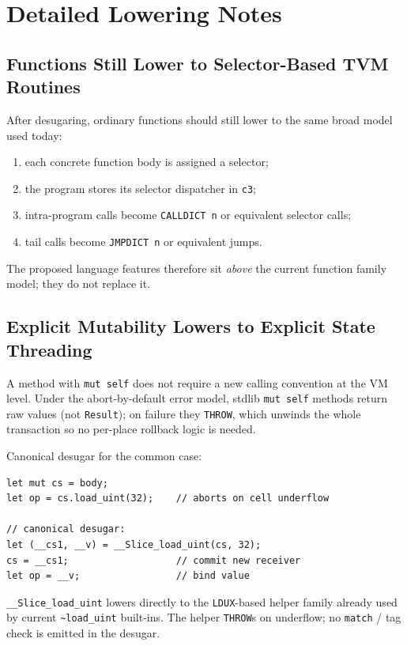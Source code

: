 \documentclass[12pt,oneside]{article}
\begin{document}
\section{Detailed Lowering Notes}
\subsection{Functions Still Lower to Selector-Based TVM Routines}
After desugaring, ordinary functions should still lower to the same broad model
used today:

\begin{enumerate}
\item each concrete function body is assigned a selector;
\item the program stores its selector dispatcher in \verb|c3|;
\item intra-program calls become \verb|CALLDICT n| or equivalent selector
calls;
\item tail calls become \verb|JMPDICT n| or equivalent jumps.
\end{enumerate}

The proposed language features therefore sit \emph{above} the current function
family model; they do not replace it.

\subsection{Explicit Mutability Lowers to Explicit State Threading}
A method with \verb|mut self| does not require a new calling
convention at the VM level. Under the abort-by-default error model,
stdlib \verb|mut self| methods return raw values (not \verb|Result|);
on failure they \verb|THROW|, which unwinds the whole transaction so
no per-place rollback logic is needed.

Canonical desugar for the common case:

\begin{verbatim}
let mut cs = body;
let op = cs.load_uint(32);    // aborts on cell underflow

// canonical desugar:
let (__cs1, __v) = __Slice_load_uint(cs, 32);
cs = __cs1;                   // commit new receiver
let op = __v;                 // bind value
\end{verbatim}

\verb|__Slice_load_uint| lowers directly to the \verb|LDUX|-based
helper family already used by current \verb|~load_uint| built-ins.
The helper \verb|THROW|s on underflow; no \verb|match| / tag check is
emitted in the desugar.
\end{document}
